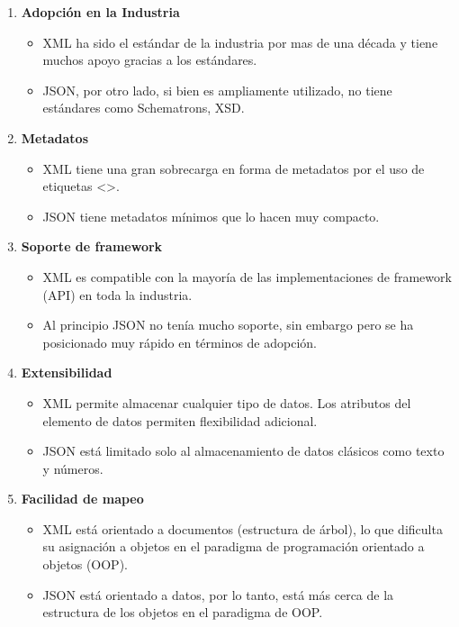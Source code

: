 \begin{enumerate}
    \item \textbf{Adopción en la Industria}
    \begin{itemize}
        \item XML ha sido el estándar de la industria por mas de una década y tiene muchos apoyo gracias a los estándares.
        \item JSON, por otro lado, si bien es ampliamente utilizado, no tiene estándares como Schematrons, XSD.
    \end{itemize}
    
    \item \textbf{Metadatos}
    \begin{itemize}
        \item XML tiene una gran sobrecarga en forma de metadatos por el uso de etiquetas \textless \textgreater.
        \item JSON tiene metadatos mínimos que lo hacen muy compacto.
    \end{itemize}
    
    \item \textbf{Soporte de framework}
    \begin{itemize}
        \item XML es compatible con la mayoría de las implementaciones de framework (API) en toda la industria.
        \item Al principio JSON no tenía mucho soporte, sin embargo pero se ha posicionado muy rápido en términos de adopción.
    \end{itemize}
    
    \item \textbf{Extensibilidad}
    \begin{itemize}
        \item XML permite almacenar cualquier tipo de datos. Los atributos del elemento de datos permiten flexibilidad adicional.
        \item JSON está limitado solo al almacenamiento de datos clásicos como texto y números.
    \end{itemize}
    
    \item \textbf{Facilidad de mapeo}
    \begin{itemize}
        \item XML está orientado a documentos (estructura de árbol), lo que dificulta su asignación a objetos en el paradigma de programación orientado a objetos (OOP).
        \item JSON está orientado a datos, por lo tanto, está más cerca de la estructura de los objetos en el paradigma de OOP.
    \end{itemize}
    

\end{enumerate}
